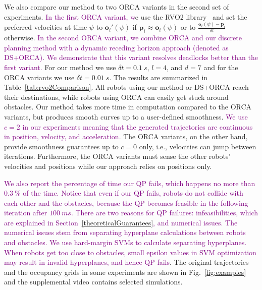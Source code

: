 \documentclass{svproc}
\newcommand{\vp}{\mathbf{p}}
\newcommand{\vo}{\mathbf{o}}
\newcommand{\changed}[1]{\textcolor{purple}{#1}}
\begin{document}
We also compare our method to two ORCA variants in the second set of experiments.
\changed{In the first ORCA variant, w}e use the RVO2 library~\cite{orca} and set the preferred velocities at time $\psi$ to $\vo_i'(\psi)$ if $\vp_i\approx \vo_i(\psi)$ or to $\frac{\vo_i(\psi) - \vp_i}{\delta t}$ otherwise.
\changed{In the second ORCA variant, we combine ORCA and our discrete planning method with a dynamic receding horizon approach (denoted as DS+ORCA). We demonstrate that this variant resolves deadlocks better than the first variant.}
For our method we use $\delta t = \SI{0.1}{s}$, $l=4$, and $d=7$ and for the ORCA variants we use $\delta t = \SI{0.01}{s}$.
The results are summarized in Table~\ref{tab:rvo2Comparison}.
All robots using our method or DS+ORCA reach their destinations, while robots using ORCA can easily get stuck around obstacles.
Our method takes more time in computation compared to the ORCA variants, but produces smooth curves up to a user-defined smoothness.
\changed{We use $c=2$ in our experiments meaning that the generated trajectories are continuous in position, velocity, and acceleration.}
The ORCA variants, on the other hand, provide smoothness guarantees up to $c=0$ only, i.e., velocities can jump between iterations.
Furthermore, the ORCA variants must sense the other robots' velocities and positions while our approach relies on positions only.

\changed{We also report the percentage of time our QP fails, which happens no more than $\SI{0.3}{\percent}$ of the time. Notice that even if our QP fails, robots do not collide with each other and the obstacles, because the QP becomes feasible in the following iteration after $\SI{100}{ms}$. There are two reasons for QP failures: infeasibilities, which are explained in Section~\ref{theoreticalGuarantees}, and numerical issues. The numerical issues stem from separating hyperplane calculations between robots and obstacles. We use hard-margin SVMs to calculate separating hyperplanes. When robots get too close to obstacles, small epsilon values in SVM optimization may result in invalid hyperplanes, and hence QP fails}.
The original trajectories and the occupancy grids in some experiments are shown in Fig.~\ref{fig:examples} and the supplemental video contains selected simulations.
\end{document}
